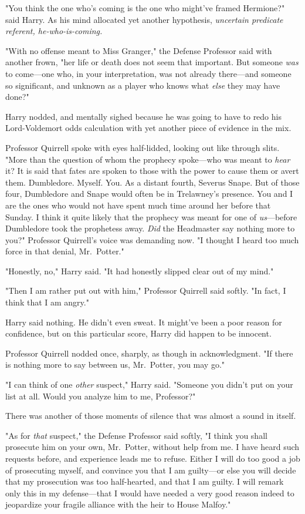 "You think the one who's coming is the one who might've framed Hermione?" said
Harry. As his mind allocated yet another hypothesis, \emph{uncertain predicate
referent, he-who-is-coming.}

"With no offense meant to Miss Granger," the Defense Professor said with
another frown, "her life or death does not seem that important. But someone
\emph{was} to come---one who, in your interpretation, was not already
there---and someone so significant, and unknown as a player{\el} who knows
what \emph{else} they may have done?"

Harry nodded, and mentally sighed because he was going to have to redo his
Lord-Voldemort odds calculation with yet another piece of evidence in the mix.

Professor Quirrell spoke with eyes half-lidded, looking out like through slits.
"More than the question of whom the prophecy spoke---who was meant to
\emph{hear} it? It is said that fates are spoken to those with the power to
cause them or avert them. Dumbledore. Myself. You. As a distant fourth, Severus
Snape. But of those four, Dumbledore and Snape would often be in Trelawney's
presence. You and I are the ones who would not have spent much time around her
before that Sunday. I think it quite likely that the prophecy was meant for one
of \emph{us}---before Dumbledore took the prophetess away. \emph{Did} the
Headmaster say nothing more to you?" Professor Quirrell's voice was demanding
now. "I thought I heard too much force in that denial, Mr.~Potter."

"Honestly, no," Harry said. "It had honestly slipped clear out of my mind."

"Then I am rather put out with him," Professor Quirrell said softly. "In fact,
I think that I am angry."

Harry said nothing. He didn't even sweat. It might've been a poor reason for
confidence, but on this particular score, Harry did happen to be innocent.

Professor Quirrell nodded once, sharply, as though in acknowledgment. "If there
is nothing more to say between us, Mr.~Potter, you may go."

"I can think of one \emph{other} suspect," Harry said. "Someone you didn't put
on your list at all. Would you analyze him to me, Professor?"

There was another of those moments of silence that was almost a sound in itself.

"As for \emph{that} suspect," the Defense Professor said softly, "I think you
shall prosecute him on your own, Mr.~Potter, without help from me. I have heard
such requests before, and experience leads me to refuse. Either I will do too
good a job of prosecuting myself, and convince you that I am guilty---or else
you will decide that my prosecution was too half-hearted, and that I am guilty.
I will remark only this in my defense---that I would have needed a very good
reason indeed to jeopardize your fragile alliance with the heir to House
Malfoy."
\sbreak
